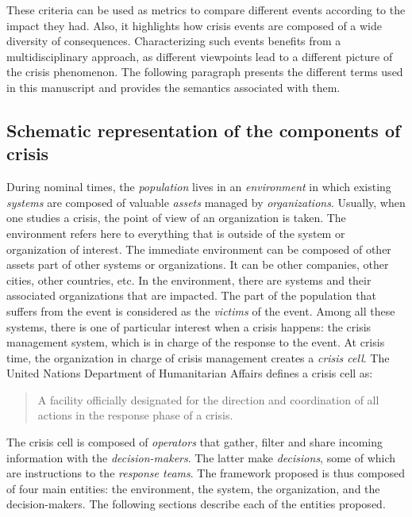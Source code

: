 These criteria can be used as metrics to compare different events according to the impact they had.
Also, it highlights how crisis events are composed of a wide diversity of consequences.
Characterizing such events benefits from a multidisciplinary approach, as different viewpoints lead to a different picture of the crisis phenomenon.
The following paragraph presents the different terms used in this manuscript and provides the semantics associated with them.

\subsection{Schematic representation of the components of crisis}
During nominal times, the \emph{population} lives in an \emph{environment} in which existing \emph{systems} are composed of valuable \emph{assets} managed by \emph{organizations}.
Usually, when one studies a crisis, the point of view of an organization is taken.
The environment refers here to everything that is outside of the system or organization of interest.
The immediate environment can be composed of other assets part of other systems or organizations.
It can be other companies, other cities, other countries, etc.
In the environment, there are systems and their associated organizations that are impacted.
The part of the population that suffers from the event is considered as the \emph{victims} of the event.
Among all these systems, there is one of particular interest when a crisis happens: the crisis management system, which is in charge of the response to the event.
At crisis time, the organization in charge of crisis management creates a \emph{crisis cell}.
The United Nations Department of Humanitarian Affairs \parencite{undepartmentofhumanitarianaffairsInternationallyAgreedGlossary1992} defines a crisis cell as:
\blockquote{A facility officially designated for the direction and coordination of all actions in the response phase of a crisis.}
The crisis cell is composed of \emph{operators} that gather, filter and share incoming information with the \emph{decision-makers}.
The latter make \emph{decisions}, some of which are instructions to the \emph{response teams}.
The framework proposed is thus composed of four main entities: the environment, the system, the organization, and the decision-makers.
The following sections describe each of the entities proposed.

